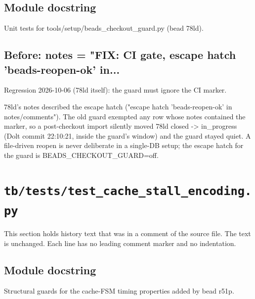 \begin{record}

\subsection*{Module docstring}

\begin{textblock}
Unit tests for tools/setup/beads_checkout_guard.py (bead 78ld).
\end{textblock}

\subsection*{Before: notes = "FIX: CI gate, escape hatch 'beads-reopen-ok' in...}

\begin{textblock}
Regression 2026-10-06 (78ld itself): the guard must ignore the CI marker.

78ld's notes described the escape hatch ("escape hatch 'beads-reopen-ok' in
notes/comments"). The old guard exempted any row whose notes contained the
marker, so a post-checkout import silently moved 78ld closed -> in_progress
(Dolt commit 22:10:21, inside the guard's window) and the guard stayed
quiet. A file-driven reopen is never deliberate in a single-DB setup; the
escape hatch for the guard is BEADS_CHECKOUT_GUARD=off.
\end{textblock}

\end{record}

\section{\texttt{tb/tests/test\_cache\_stall\_encoding.py}}\label{cr:suite:test-cache-stall-encoding}

This section holds history text that was in a comment of the source file. The text is unchanged. Each line has no leading comment marker and no indentation.

\begin{record}

\subsection*{Module docstring}

\begin{textblock}
Structural guards for the cache-FSM timing properties added by bead r51p.
\end{textblock}

\end{record}

